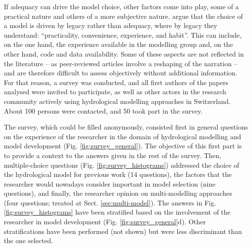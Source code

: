 \documentclass[10pt,a4paper]{article}
\begin{document}
If adequacy can drive the model choice, other factors come into play, some of a practical nature and others of a more subjective nature. \citet{Addor2019} argue that the choice of a model is driven by legacy rather than adequacy, where by legacy they understand: ``practicality, convenience, experience, and habit''. This can include, on the one hand, the experience available in the modelling group and, on the other hand, code and data availability. Some of these aspects are not reflected in the literature -- as peer-reviewed articles involve a reshaping of the narration \citep{Pontille2007, Rinck2010, Babel2019} -- and are therefore difficult to assess objectively without additional information. For that reason, a survey was conducted, and all first authors of the papers analysed were invited to participate, as well as other actors in the research community actively using hydrological modelling approaches in Switzerland. About 100 persons were contacted, and 50 took part in the survey.

The survey, which could be filled anonymously, consisted first in general questions on the experience of the researcher in the domain of hydrological modelling and model development (Fig. \ref{fig:survey_general}). The objective of this first part is to provide a context to the answers given in the rest of the survey. Then, multiple-choice questions (Fig. \ref{fig:survey_histograms}) addressed the choice of the hydrological model for previous work (14 questions), the factors that the researcher would nowadays consider important in model selection (nine questions), and finally, the researcher opinion on multi-modelling approaches (four questions; treated at Sect. \ref{sec:multi-model}). The answers in Fig. \ref{fig:survey_histograms} have been stratified based on the involvement of the researcher in model development (Fig. \ref{fig:survey_general}d). Other stratifications have been performed (not shown) but were less discriminant than the one selected.
\end{document}
